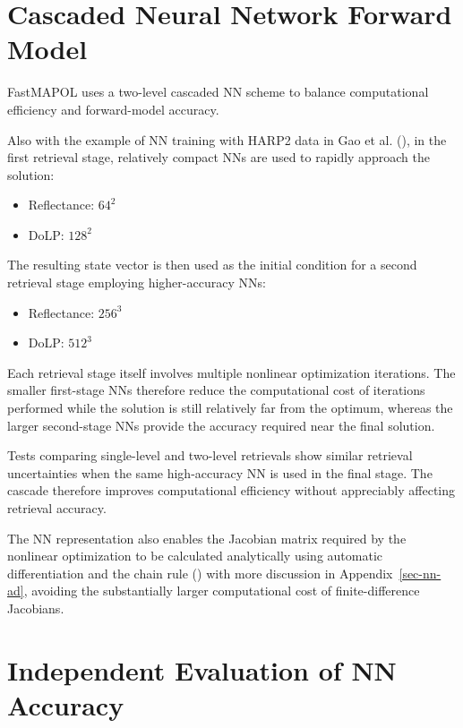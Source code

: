 \documentclass[
  11pt,
  letterpaper,
]{scrreprt}
\providecommand{\tightlist}{%
  \setlength{\itemsep}{0pt}\setlength{\parskip}{0pt}}
\begin{document}
\section{Cascaded Neural Network Forward
Model}\label{cascaded-neural-network-forward-model}

FastMAPOL uses a two-level cascaded NN scheme to balance computational
efficiency and forward-model accuracy.

Also with the example of NN training with HARP2 data in Gao et al.
(), in the first retrieval stage,
relatively compact NNs are used to rapidly approach the solution:

\begin{itemize}
\tightlist
\item
  Reflectance: \(64^2\)
\item
  DoLP: \(128^2\)
\end{itemize}

The resulting state vector is then used as the initial condition for a
second retrieval stage employing higher-accuracy NNs:

\begin{itemize}
\tightlist
\item
  Reflectance: \(256^3\)
\item
  DoLP: \(512^3\)
\end{itemize}

Each retrieval stage itself involves multiple nonlinear optimization
iterations. The smaller first-stage NNs therefore reduce the
computational cost of iterations performed while the solution is still
relatively far from the optimum, whereas the larger second-stage NNs
provide the accuracy required near the final solution.

Tests comparing single-level and two-level retrievals show similar
retrieval uncertainties when the same high-accuracy NN is used in the
final stage. The cascade therefore improves computational efficiency
without appreciably affecting retrieval accuracy.

The NN representation also enables the Jacobian matrix required by the
nonlinear optimization to be calculated analytically using automatic
differentiation and the chain rule () with more discussion in Appendix~\ref{sec-nn-ad}, avoiding the
substantially larger computational cost of finite-difference Jacobians.

\section{Independent Evaluation of NN
Accuracy}\label{independent-evaluation-of-nn-accuracy}
\end{document}
